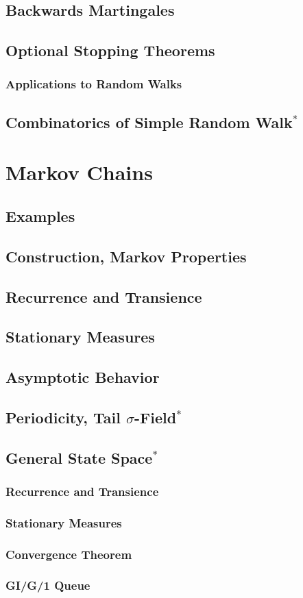 \documentclass[11pt]{article}
\newcommand{\stubsection}[1]{\section{#1}\mbox{}\par}
\newcommand{\stubsubsection}[1]{\subsection{#1}\mbox{}\par}
\newcommand{\stubsubsubsection}[1]{\subsubsection{#1}\mbox{}\par}
\begin{document}
\stubsubsection{Backwards Martingales}

\stubsubsection{Optional Stopping Theorems}

\stubsubsubsection{Applications to Random Walks}

\stubsubsection{Combinatorics of Simple Random Walk\texorpdfstring{$^\ast$}{*}}

\stubsection{Markov Chains}

\stubsubsection{Examples}

\stubsubsection{Construction, Markov Properties}

\stubsubsection{Recurrence and Transience}

\stubsubsection{Stationary Measures}

\stubsubsection{Asymptotic Behavior}

\stubsubsection{\texorpdfstring{Periodicity, Tail $\sigma$-Field}{Periodicity, Tail sigma-Field}\texorpdfstring{$^\ast$}{*}}

\stubsubsection{General State Space\texorpdfstring{$^\ast$}{*}}

\stubsubsubsection{Recurrence and Transience}

\stubsubsubsection{Stationary Measures}

\stubsubsubsection{Convergence Theorem}

\stubsubsubsection{GI/G/1 Queue}
\end{document}
